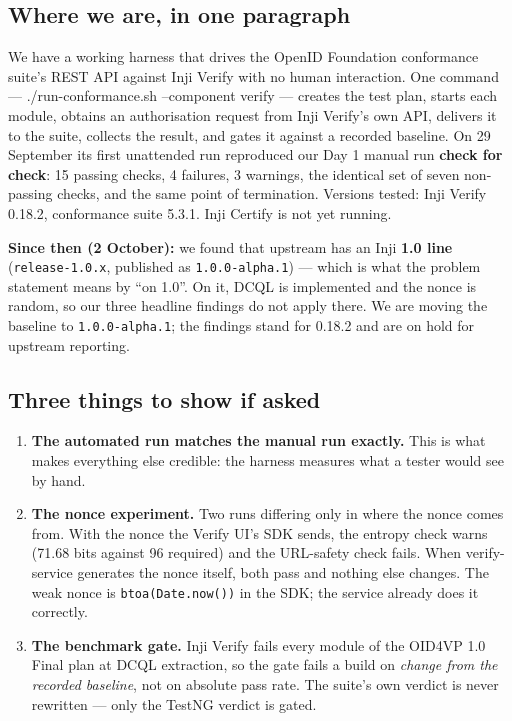 \documentclass[10pt,a4paper]{article}
\newcommand{\tightlist}{\setlength{\itemsep}{1pt}\setlength{\parskip}{0pt}\setlength{\parsep}{0pt}}
\newcommand{\cmd}[1]{\colorbox{box}{#1}}
\begin{document}
\subsection{Where we are, in one paragraph}

We have a working harness that drives the OpenID Foundation conformance suite's REST API
against Inji Verify with no human interaction. One command ---
\cmd{./run-conformance.sh --component verify} --- creates the test plan, starts each
module, obtains an authorisation request from Inji Verify's own API, delivers it to the
suite, collects the result, and gates it against a recorded baseline. On 29 September its
first unattended run reproduced our Day 1 manual run \textbf{check for check}: 15
passing checks, 4 failures, 3 warnings, the identical set of seven non-passing checks, and
the same point of termination. Versions tested: Inji Verify 0.18.2, conformance suite
5.3.1. Inji Certify is not yet running.

\textbf{Since then (2 October):} we found that upstream has an Inji \textbf{1.0 line}
(\texttt{release-1.0.x}, published as \texttt{1.0.0-alpha.1}) --- which is what the problem
statement means by ``on 1.0''. On it, DCQL is implemented and the nonce is random, so our
three headline findings do not apply there. We are moving the baseline to
\texttt{1.0.0-alpha.1}; the findings stand for 0.18.2 and are on hold for upstream
reporting.

\subsection{Three things to show if asked}

\begin{enumerate}\tightlist
  \item \textbf{The automated run matches the manual run exactly.} This is what makes
        everything else credible: the harness measures what a tester would see by hand.
  \item \textbf{The nonce experiment.} Two runs differing only in where the nonce comes
        from. With the nonce the Verify UI's SDK sends, the entropy check warns (71.68
        bits against 96 required) and the URL-safety check fails. When verify-service
        generates the nonce itself, both pass and nothing else changes. The weak nonce is
        \texttt{btoa(Date.now())} in the SDK; the service already does it correctly.
  \item \textbf{The benchmark gate.} Inji Verify fails every module of the OID4VP 1.0
        Final plan at DCQL extraction, so the gate fails a build on \emph{change from the
        recorded baseline}, not on absolute pass rate. The suite's own verdict is never
        rewritten --- only the TestNG verdict is gated.
\end{enumerate}
\end{document}
